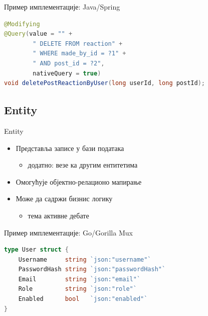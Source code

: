 \documentclass{beamer}
\begin{document}
    \begin{frame}[fragile]{Пример имплементације: Java/Spring}
        \begin{adjustbox}{width=\textwidth,height=\textheight,keepaspectratio}
			\begin{lstlisting}[language=java]
@Modifying
@Query(value = "" +
        " DELETE FROM reaction" +
        " WHERE made_by_id = ?1" +
        " AND post_id = ?2",
        nativeQuery = true)
void deletePostReactionByUser(long userId, long postId);
			\end{lstlisting}
		\end{adjustbox}
    \end{frame}
    
    \subsection{Entity}
    
    \begin{frame}{Entity}
        \begin{itemize}
			\item Представља записе у бази података
			\begin{itemize}
				\item додатно: везе ка другим ентитетима
        	\end{itemize}
			\item Омогућује објектно-релационо мапирање
			\item Може да садржи бизнис логику
			\begin{itemize}
				\item тема активне дебате
        	\end{itemize}
        \end{itemize}
    \end{frame}
    
    \begin{frame}[fragile]{Пример имплементације: Go/Gorilla Mux}
    	\begin{adjustbox}{width=\textwidth,height=\textheight,keepaspectratio}
			\begin{lstlisting}[language=go]
type User struct {
	Username     string `json:"username"`
	PasswordHash string `json:"passwordHash"`
	Email        string `json:"email"`
	Role         string `json:"role"`
	Enabled      bool   `json:"enabled"`
}
			\end{lstlisting}
		\end{adjustbox}
    \end{frame}
    
\end{document}
